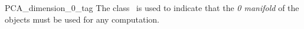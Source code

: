 
\begin{ccRefClass}{PCA_dimension_0_tag}  
\ccDefinition
The class \ccRefName\ is used to indicate that the \textit{0 manifold} of the objects must be used for any computation.



\end{ccRefClass}
